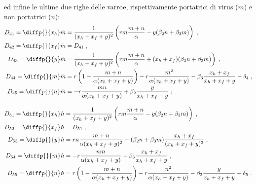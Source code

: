 ed infine le ultime due righe delle varroe, rispettivamente portatrici di virus ($m$) e non portatrici ($n$):
\begin{equation}
\begin{split}
D_{41} = \diffp{}{{x_h}} \dot{m} &= \frac{1}{(x_h+x_f+y)^2} \left( r m \frac{m+n}{\alpha}
    - y ( \beta_2 n + \beta_3 m ) \right) \; , \\
D_{42} = \diffp{}{{x_f}} \dot{m} &= D_{41} \; , \\
D_{43} = \diffp{}{y} \dot{m} &= \frac{1}{(x_h+x_f+y)^2} \left( r m \frac{m+n}{\alpha}
    +(x_h+x_f) ( \beta_2 n + \beta_3 m ) \right) \; , \\
D_{44} = \diffp{}{m} \dot{m} &= r \left( 1 - \frac{m+n}{\alpha (x_h+x_f+y)} \right)
    - r \frac{m^2}{\alpha (x_h+x_f+y)} - \beta_3 \frac{x_h+x_f}{x_h+x_f+y} - \delta_4 \; , \\
D_{45} = \diffp{}{n} \dot{m} &= - r \frac{m n}{\alpha (x_h +x_f+y)} + \beta_2 \frac{y}{x_h+x_f+y} \; ;
\end{split}
\end{equation}

\begin{equation}
\begin{split}
D_{51} = \diffp{}{{x_h}} \dot{n} &= \frac{1}{(x_h+x_f+y)^2} \left( r m \frac{m+n}{\alpha}
    - y ( \beta_2 n + \beta_3 m ) \right) \; , \\
D_{52} = \diffp{}{{x_f}} \dot{n} &= D_{51} \; , \\
D_{53} = \diffp{}{y} \dot{n} &= r n \frac{m+n}{\alpha (x_h+x_f+y)^2}
    -(\beta_2 n + \beta_3 m) \frac{x_h+x_f}{(x_h+x_f+y)^2} \; , \\
D_{54} = \diffp{}{m} \dot{n} &= - r \frac{n m}{\alpha (x_h+x_f+y)} + \beta_3 \frac{x_h+x_f}{x_h+x_f+y} \;  , \\
D_{55} = \diffp{}{n} \dot{n} &= r \left( 1 - \frac{m+n}{\alpha (x_h+x_f+y)} \right)
    - r \frac{n^2}{\alpha (x_h+x_f+y)} - \beta_2 \frac{y}{x_h+x_f+y} - \delta_5 \; .
\end{split}
\end{equation}


